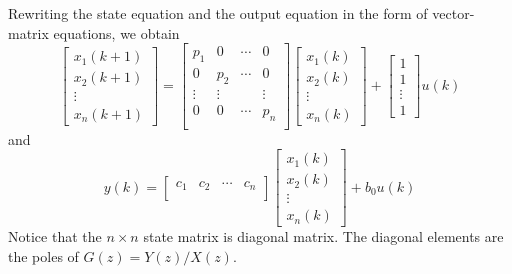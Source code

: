 \documentclass[12pt,a4paper,oneside]{book}
\begin{document}
\begin{onehalfspace}
Rewriting the state equation and the output equation in the form of 
vector-matrix equations, we obtain
\begin{equation}\label{pfepm_eq_10}
	\left[\begin{matrix}
		x_1(k+1) \\
		x_2(k+1) \\
		\vdots \\
		x_n(k+1)
	\end{matrix}\right] = 
	\left[\begin{matrix}
		p_1 & 0 & \cdots & 0 \\
		0 & p_2 & \cdots & 0 \\
		\vdots & \vdots & & \vdots\\
		0 & 0 & \cdots & p_n \\
	\end{matrix}\right]
	\left[\begin{matrix}
		x_1(k) \\
		x_2(k) \\
		\vdots \\
		x_n(k)
	\end{matrix}\right] + 
	\left[\begin{matrix}
		1 \\
		1 \\
		\vdots \\
		1
	\end{matrix}\right] u(k)
\end{equation}
and
\begin{equation}\label{pfepm_eq_11}
	y(k) = 
	\left[\begin{matrix}
		c_1 & c_2 & \cdots & c_n \\
	\end{matrix}\right] 
	\left[\begin{matrix}
		x_1(k) \\
		x_2(k) \\
		\vdots \\
		x_n(k)
	\end{matrix}\right] + b_0 u(k)
\end{equation}
Notice that the $n \times n$ state matrix is diagonal matrix. The diagonal 
elements are the poles of $G(z) = {Y(z)}/{X(z)}$.


\end{onehalfspace}
\end{document}
